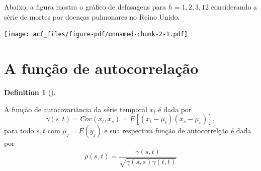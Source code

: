\documentclass[
  letterpaper,
  DIV=11,
  numbers=noendperiod]{scrreprt}
\theoremstyle{plain}
\theoremstyle{definition}
\newtheorem{definition}{Definition}[chapter]
\theoremstyle{definition}
\theoremstyle{remark}
\begin{document}
Abaixo, a figura mostra o gráfico de defasagens para \(h=1,2,3,12\)
considerando a série de mortes por doenças pulmonares no Reino Unido.

\texttt{[image: acf\_files/figure-pdf/unnamed-chunk-2-1.pdf]}

\hypertarget{a-funuxe7uxe3o-de-autocorrelauxe7uxe3o}{%
\section{A função de
autocorrelação}\label{a-funuxe7uxe3o-de-autocorrelauxe7uxe3o}}

\begin{definition}[]\protect\hypertarget{def-autocovariancia}{}\label{def-autocovariancia}

A função de autocovariância da série temporal \(x_t\) é dada por
\[\begin{equation}
          \gamma(s,t) = Cov(x_t,x_s)=E\left[(x_t-\mu_t)(x_s-\mu_s)\right],
        \end{equation}\] para todo \(s,t\) com \(\mu_j=E(y_j)\) e sua
respectiva função de autocorrelção é dada por \[\begin{equation}
        \rho(s,t)=\frac{\gamma(s,t)}{\sqrt{\gamma(s,s)\gamma(t,t)}}
        \end{equation}\]

\end{definition}
\end{document}

